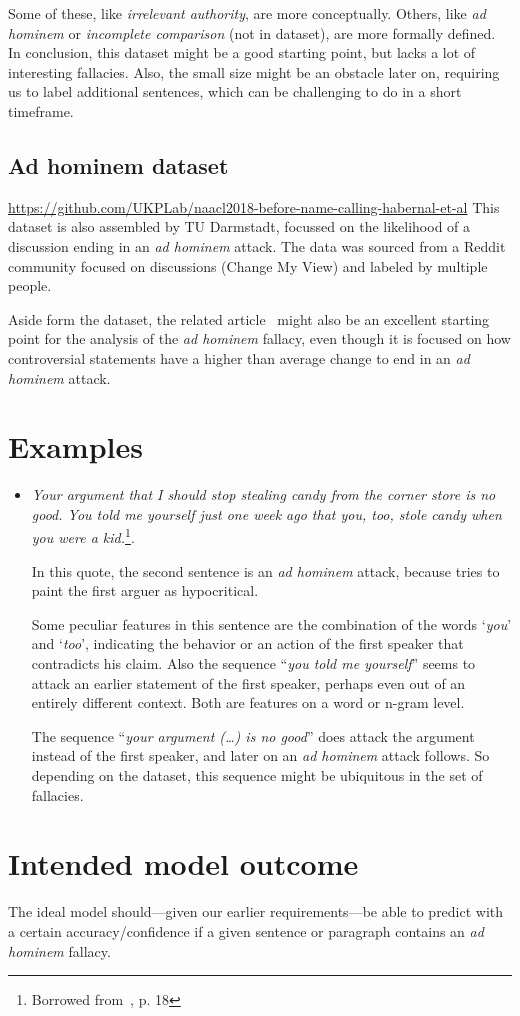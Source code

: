 \documentclass[a4paper]{article}
\begin{document}
Some of these, like \emph{irrelevant authority}, are more conceptually. Others, like \emph{ad hominem} or \emph{incomplete comparison} (not in dataset), are more formally defined. In conclusion, this dataset might be a good starting point, but lacks a lot of interesting fallacies. Also, the small size might be an obstacle later on, requiring us to label additional sentences, which can be challenging to do in a short timeframe. 

\subsection{Ad hominem dataset~\cite{Habernal.et.al.2018.NAACL.adhominem}}
\url{https://github.com/UKPLab/naacl2018-before-name-calling-habernal-et-al}
This dataset is also assembled by TU Darmstadt, focussed on the likelihood of a discussion ending in an \emph{ad hominem} attack. The data was sourced from a Reddit community focused on discussions (Change My View) and labeled by multiple people.  

Aside form the dataset, the related article~\cite{Habernal.et.al.2018.NAACL.adhominem} might also be an excellent starting point for the analysis of the \emph{ad hominem} fallacy, even though it is focused on how controversial statements have a higher than average change to end in an \emph{ad hominem} attack.
\section{Examples}

\begin{itemize}
    \item \emph{Your argument that I should stop stealing candy from the corner store is no good. You told me yourself just one week ago that you, too, stole candy when you were a kid.}\footnote{Borrowed from~\cite{Walton1998}, p. 18}.
    
    In this quote, the second sentence is an \emph{ad hominem} attack, because tries to paint the first arguer as hypocritical. 

    Some peculiar features in this sentence are the combination of the words `\emph{you}' and `\emph{too}', indicating the behavior or an action of the first speaker  that contradicts his claim. Also the sequence ``\emph{you told me yourself}'' seems to attack an earlier statement of the first speaker, perhaps even out of an entirely different context. Both are features on a word or n-gram level.

    The sequence ``\emph{your argument (\dots) is no good}'' does attack the argument instead of the first speaker, and later on an \emph{ad hominem} attack follows. So depending on the dataset, this sequence might be ubiquitous in the set of fallacies.

\end{itemize}

\section{Intended model outcome}
The ideal model should---given our earlier requirements---be able to predict with a certain accuracy/confidence if a given sentence or paragraph contains an \emph{ad hominem} fallacy.



\end{document}
